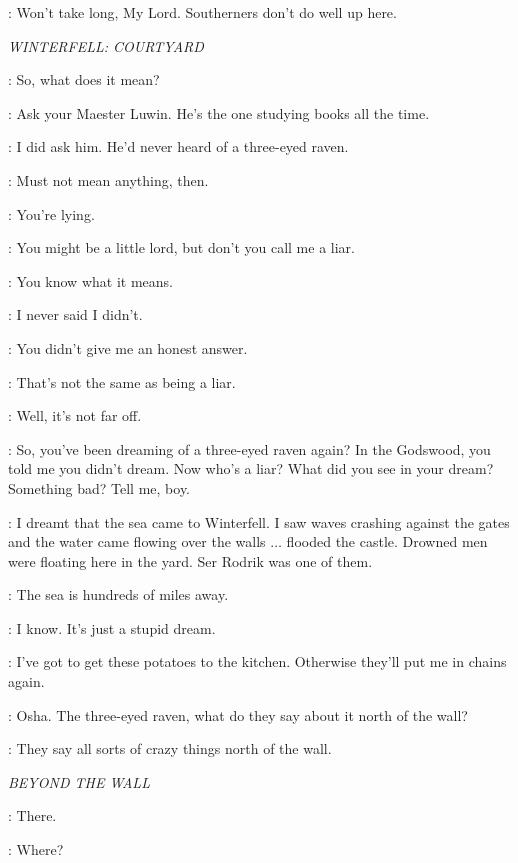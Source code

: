 \RODRIK: Won't take long, My Lord. Southerners don't do well up here. 


\scene

\textit{WINTERFELL: COURTYARD} 


\BRAN: So, what does it mean? 

\OSHA: Ask your Maester Luwin. He's the one studying books all the time. 

\BRAN: I did ask him. He'd never heard of a three-eyed raven. 

\OSHA: Must not mean anything, then. 

\BRAN: You're lying. 

\OSHA: You might be a little lord, but don't you call me a liar. 

\BRAN: You know what it means. 

\OSHA: I never said I didn't. 

\BRAN: You didn't give me an honest answer. 

\OSHA: That's not the same as being a liar. 

\BRAN: Well, it's not far off. 

\OSHA: So, you've been dreaming of a three-eyed raven again? In the Godswood, you told me you didn't dream. Now who's a liar? What did you see in your dream? Something bad? Tell me, boy. 

\BRAN: I dreamt that the sea came to Winterfell. I saw waves crashing against the gates and the water came flowing over the walls $\ldots$ flooded the castle. Drowned men were floating here in the yard. Ser Rodrik was one of them. 

\OSHA: The sea is hundreds of miles away. 

\BRAN: I know. It's just a stupid dream. 

\OSHA: I've got to get these potatoes to the kitchen. Otherwise they'll put me in chains again. 

\BRAN: Osha. The three-eyed raven, what do they say about it north of the wall? 

\OSHA: They say all sorts of crazy things north of the wall. 


\scene

\textit{BEYOND THE WALL} 


\HALFHAND: There. 

\JEOR: Where? 

